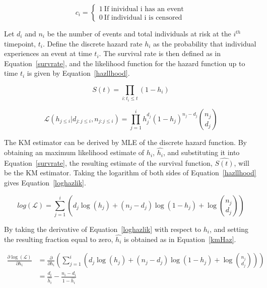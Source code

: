 \begin{equation}
    c_{i} = \begin{cases}
        1 \ \text{If inividual i has an event} \\
        0 \ \text{If individual i is censored}
    \end{cases}
    \label{censInd}  
\end{equation}

Let $d_i$ and $n_i$ be the number of events and total individuals at risk at the $i^{th}$ timepoint, $t_i$. Define the discrete hazard rate $h_i$ as the probability that individual experiences an event at time $t_i$. The survival rate is then defined as in Equation~\ref{survrate}, and the likelihood function for the hazard function up to time $t_i$ is given by Equation~\ref{hazllhood}.

\begin{equation}
    S(t) = \prod_{i:t_i \leq t} (1 - h_i)
    \label{survrate}
\end{equation}

\begin{equation}
    \mathcal{L}(h_{j\leq i}|d_{j:j\leq i}, n_{j:j\leq i}) = \prod_{j=1}^i h_j^{d_j}(1-h_j)^{n_j-d_j}\binom{n_j}{d_j}
    \label{hazllhood}
\end{equation}

The KM estimator can be derived by MLE of the discrete hazard function. By obtaining an maximum likelihood estimate of $h_i$, $\hat{h_i}$, and substituting it into Equation~\ref{survrate}, the resulting estimate of the survival function, $\hat{S(t)}$, will be the KM estimator. Taking the logarithm of both sides of Equation~\ref{hazllhood} gives Equation~\ref{loghazlik}.

\begin{equation}
    log(\mathcal{L}) = \sum_{j=1}^i \left(d_j\log(h_j)+(n_j-d_j)\log(1-h_j) + \log \binom{n_j}{d_j}\right)
    \label{loghazlik}
\end{equation}

By taking the derivative of Equation~\ref{loghazlik} with respect to $h_i$, and setting the resulting fraction equal to zero, $\hat{h_i}$ is obtained as in Equation~\ref{kmHaz}.

\begin{align}
    \frac{\partial \log(\mathcal{L})}{\partial h_i} &= \frac{\partial}{\partial h_i}\left(\sum_{j=1}^i \left(d_j\log(h_j)+(n_j-d_j)\log(1-h_j) + \log \binom{n_j}{d_j}\right)\right) \\
    &= \frac{d_i}{\hat{h_i}} - \frac{n_i - d_i}{1 - \hat{h_i}}
\end{align}

